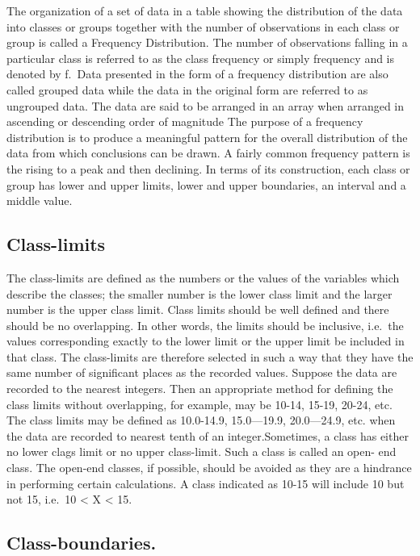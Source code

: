 \documentclass[]{article}
\begin{document}
The organization of a set of data in a table showing the distribution of
the data into classes or groups together with the number of observations
in each class or group is called a Frequency Distribution. The number of
observations falling in a particular class is referred to as the class
frequency or simply frequency and is denoted by f.~Data presented in the
form of a frequency distribution are also called grouped data while the
data in the original form are referred to as ungrouped data. The data
are said to be arranged in an array when arranged in ascending or
descending order of magnitude The purpose of a frequency distribution is
to produce a meaningful pattern for the overall distribution of the data
from which conclusions can be drawn. A fairly common frequency pattern
is the rising to a peak and then declining. In terms of its
construction, each class or group has lower and upper limits, lower and
upper boundaries, an interval and a middle value.

\hypertarget{class-limits}{%
\subsection{Class-limits}\label{class-limits}}

The class-limits are defined as the numbers or the values of the
variables which describe the classes; the smaller number is the lower
class limit and the larger number is the upper class limit. Class limits
should be well defined and there should be no overlapping. In other
words, the limits should be inclusive, i.e.~the values corresponding
exactly to the lower limit or the upper limit be included in that class.
The class-limits are therefore selected in such a way that they have the
same number of significant places as the recorded values. Suppose the
data are recorded to the nearest integers. Then an appropriate method
for defining the class limits without overlapping, for example, may be
10-14, 15-19, 20-24, etc. The class limits may be defined as 10.0-14.9,
15.0---19.9, 20.0---24.9, etc. when the data are recorded to nearest
tenth of an integer.Sometimes, a class has either no lower clags limit
or no upper class-limit. Such a class is called an open- end class. The
open-end classes, if possible, should be avoided as they are a hindrance
in performing certain calculations. A class indicated as 10-15 will
include 10 but not 15, i.e.~10 \textless{} X \textless{} 15.

\hypertarget{class-boundaries.}{%
\subsection{Class-boundaries.}\label{class-boundaries.}}
\end{document}
